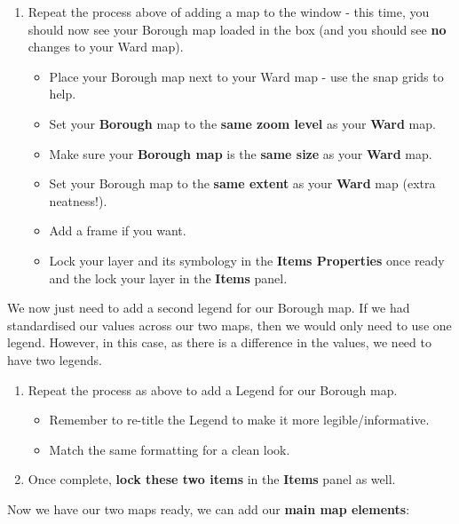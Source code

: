 \documentclass[
]{book}
\providecommand{\tightlist}{%
  \setlength{\itemsep}{0pt}\setlength{\parskip}{0pt}}
\begin{document}
\begin{enumerate}
\def\labelenumi{\arabic{enumi}.}
\setcounter{enumi}{5}
\tightlist
\item
  Repeat the process above of adding a map to the window - this time, you should now see your Borough map loaded in the box (and you should see \textbf{no} changes to your Ward map).

  \begin{itemize}
  \tightlist
  \item
    Place your Borough map next to your Ward map - use the snap grids to help.
  \item
    Set your \textbf{Borough} map to the \textbf{same zoom level} as your \textbf{Ward} map.
  \item
    Make sure your \textbf{Borough map} is the \textbf{same size} as your \textbf{Ward} map.
  \item
    Set your Borough map to the \textbf{same extent} as your \textbf{Ward} map (extra neatness!).
  \item
    Add a frame if you want.
  \item
    Lock your layer and its symbology in the \textbf{Items Properties} once ready and the lock your layer in the \textbf{Items} panel.
  \end{itemize}
\end{enumerate}

We now just need to add a second legend for our Borough map. If we had standardised our values across our two maps, then we would only need to use one legend. However, in this case, as there is a difference in the values, we need to have two legends.

\begin{enumerate}
\def\labelenumi{\arabic{enumi}.}
\setcounter{enumi}{6}
\tightlist
\item
  Repeat the process as above to add a Legend for our Borough map.

  \begin{itemize}
  \tightlist
  \item
    Remember to re-title the Legend to make it more legible/informative.
  \item
    Match the same formatting for a clean look.
  \end{itemize}
\item
  Once complete, \textbf{lock these two items} in the \textbf{Items} panel as well.
\end{enumerate}

Now we have our two maps ready, we can add our \textbf{main map elements}:
\end{document}
